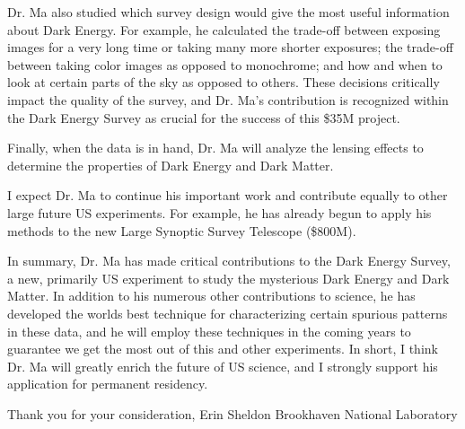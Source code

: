 \documentclass[12pt]{letter}
\begin{document}
Dr. Ma also studied which survey design would give the most useful information
about Dark Energy.  For example, he calculated the trade-off between exposing
images for a very long time or taking many more shorter exposures; the
trade-off between taking color images as opposed to monochrome; and how and
when to look at certain parts of the sky as opposed to others.  These decisions
critically impact the quality of the survey, and Dr. Ma's contribution is
recognized within the Dark Energy Survey as crucial for the success of this
\$35M project.

Finally, when the data is in hand, Dr. Ma will analyze the lensing effects
to determine the properties of Dark Energy and Dark Matter.

I expect Dr. Ma to continue his important work and contribute equally to other
large future US experiments.  For example, he has already begun to apply his
methods to the new Large Synoptic Survey Telescope (\$800M). 

In summary, Dr. Ma has made critical contributions to the Dark Energy Survey, a
new, primarily US experiment to study the mysterious Dark Energy and Dark
Matter.  In addition to his numerous other contributions to science, he has
developed the worlds best technique for characterizing certain spurious
patterns in these data, and he will employ these techniques in the coming years
to guarantee we get the most out of this and other experiments.     In short, I
think Dr. Ma will greatly enrich the future of US science, and I strongly
support his application for permanent residency. 

{\noindent Thank you for your consideration,}
\newline
\newline
{\noindent Erin Sheldon}
\newline
{\noindent Brookhaven National Laboratory}
\end{document}
